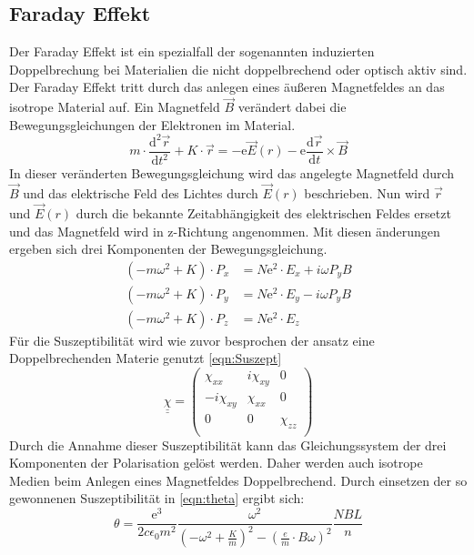 \subsection{Faraday Effekt}
Der Faraday Effekt ist ein spezialfall der sogenannten induzierten Doppelbrechung bei Materialien die nicht doppelbrechend oder optisch aktiv sind.
Der Faraday Effekt tritt durch das anlegen eines äußeren Magnetfeldes an das isotrope Material auf.
Ein Magnetfeld $\vec{B}$ verändert dabei die Bewegungsgleichungen der Elektronen im Material.
\begin{equation}
    m \cdot \frac{\text{d}^2 \vec{r}}{\text{d}t^2} + K\cdot \vec{r} = - \text{e} \vec{E}(r)- \text{e} \frac{\text{d} \vec{r}}{\text{d}t} \times \vec{B}
\end{equation}
In dieser veränderten Bewegungsgleichung wird das angelegte Magnetfeld durch $\vec{B}$ und das elektrische Feld des Lichtes durch $\vec{E}(r)$ beschrieben.
Nun wird $\vec{r}$ und $\vec{E}(r)$ durch die bekannte Zeitabhängigkeit des elektrischen Feldes ersetzt und das Magnetfeld wird in z-Richtung angenommen.
Mit diesen änderungen ergeben sich drei Komponenten der Bewegungsgleichung.
\begin{align*}
    \left(-m\omega^2 + K\right) \cdot P_x &= N \text{e}^2\cdot E_x + i\omega P_y B\\
    \left(-m\omega^2 + K\right) \cdot P_y &= N \text{e}^2\cdot E_y - i\omega P_y B\\
    \left(-m\omega^2 + K\right) \cdot P_z &= N \text{e}^2\cdot E_z
\end{align*}
Für die Suszeptibilität wird wie zuvor besprochen der ansatz eine Doppelbrechenden Materie genutzt \ref{eqn:Suszept}
\begin{equation}
    \underline{\underline{\chi}} = 
    \begin{pmatrix}
        \chi_{xx} & i \chi_{xy} & 0\\
        -i \chi_{xy} & \chi_{xx} & 0\\ 
        0 & 0 & \chi_{zz}\\
    \end{pmatrix}
\end{equation}
Durch die Annahme dieser Suszeptibilität kann das Gleichungssystem der drei Komponenten der Polarisation gelöst werden.
Daher werden auch isotrope Medien beim Anlegen eines Magnetfeldes Doppelbrechend.
Durch einsetzen der so gewonnenen Suszeptibilität in \ref{eqn:theta} ergibt sich:
\begin{equation}
    \theta = \frac{\text{e}^3}{2c\epsilon_0 m^2} \frac{\omega^2}{\left(-\omega^2 + \frac{K}{m}\right)^2 - \left(\frac{e}{m} \cdot B\omega\right)^2} \frac{NBL}{n}
\end{equation} 

